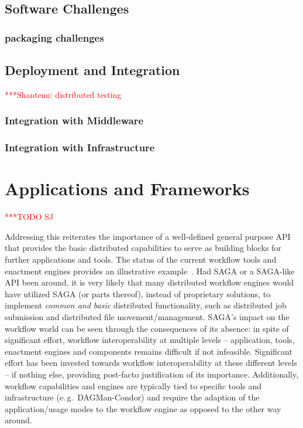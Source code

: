 \documentclass[a4paper,10pt]{article}
\newcommand{\todo}[1]{     {\textcolor{red}  { ***TODO      #1 }}}
\newcommand{\jhanote}[1]{  {\textcolor{red}  { ***Shantenu: #1 }}}
\newcommand{\todo}[1]{}
\newcommand{\jhanote}[1]{}
\begin{document}
\subsection{Software Challenges}

\subsubsection{packaging challenges}
\subsection{Deployment and Integration} 

\jhanote{distributed testing}

\subsubsection{Integration with Middleware}
\subsubsection{Integration with Infrastructure}


\section{Applications and Frameworks}\todo{SJ}
\label{apps_and_frameworks}


Addressing this reiterates the importance of a well-defined general
purpose API that provides the basic distributed capabilities to serve
as building blocks for further applications and tools. The status of
the current workflow tools and enactment engines provides an
illustrative example~\cite{nsf-workflow,1196459}. Had SAGA or a
SAGA-like API been around, it is very likely that many distributed
workflow engines would have utilized SAGA (or parts thereof), instead
of proprietary solutions, to implement {\it common and basic}
distributed functionality, such as distributed job submission and
distributed file movement/management. SAGA's impact on the workflow
world can be seen through the consequences of its absence: in spite of
significant effort, workflow interoperability at multiple levels --
application, tools, enactment engines and components remains difficult
if not infeasible.  Significant effort has been invested towards
workflow interoperability at these different levels -- if nothing
else, providing post-facto justification of its importance.
Additionally, workflow capabilities and engines are typically tied to
specific tools and infrastructure (e.\,g.\ DAGMan-Condor) and require
the adaption of the application/usage modes to the workflow engine as
opposed to the other way around.
\end{document}
